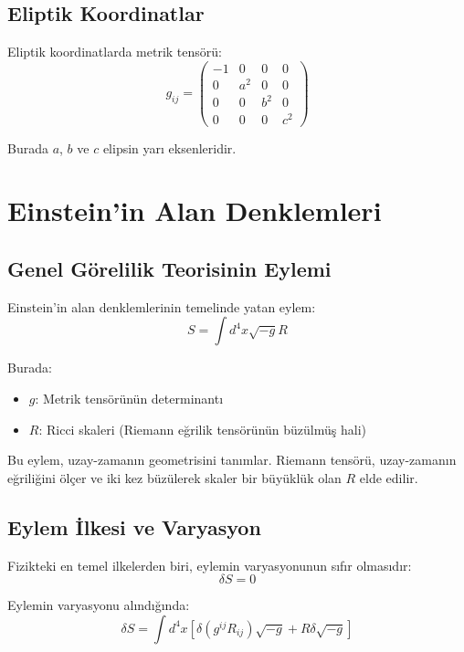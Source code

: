 \documentclass[11pt,letterpaper,twocolumn]{fenbil}
\begin{document}
\subsection{Eliptik Koordinatlar}

Eliptik koordinatlarda metrik tensörü:
\begin{equation}
g_{ij} = 
\begin{pmatrix}
-1 & 0 & 0 & 0 \\
0 & a^2 & 0 & 0 \\
0 & 0 & b^2 & 0 \\
0 & 0 & 0 & c^2
\end{pmatrix}
\end{equation}

Burada $a$, $b$ ve $c$ elipsin yarı eksenleridir.

\section{Einstein'in Alan Denklemleri}

\subsection{Genel Görelilik Teorisinin Eylemi}

Einstein'in alan denklemlerinin temelinde yatan eylem:
\begin{equation}
S = \int d^4x \sqrt{-g} R
\end{equation}

Burada:
\begin{itemize}
\item $g$: Metrik tensörünün determinantı
\item $R$: Ricci skaleri (Riemann eğrilik tensörünün büzülmüş hali)
\end{itemize}

Bu eylem, uzay-zamanın geometrisini tanımlar. Riemann tensörü, uzay-zamanın eğriliğini ölçer ve iki kez büzülerek skaler bir büyüklük olan $R$ elde edilir.

\subsection{Eylem İlkesi ve Varyasyon}

Fizikteki en temel ilkelerden biri, eylemin varyasyonunun sıfır olmasıdır:
\begin{equation}
\delta S = 0
\end{equation}

Eylemin varyasyonu alındığında:
\begin{equation}
\delta S = \int d^4x \left[\delta(g^{ij}R_{ij})\sqrt{-g} + R\delta\sqrt{-g}\right]
\end{equation}
\end{document}
